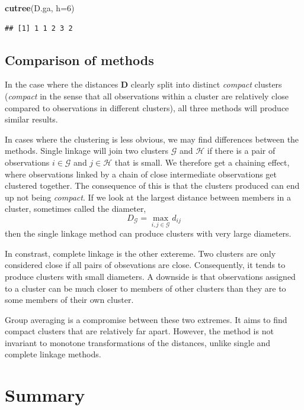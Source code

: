 \documentclass[
]{book}
\newenvironment{Shaded}{\begin{snugshade}}{\end{snugshade}}
\newcommand{\AttributeTok}[1]{\textcolor[rgb]{0.13,0.29,0.53}{#1}}
\newcommand{\DecValTok}[1]{\textcolor[rgb]{0.00,0.00,0.81}{#1}}
\newcommand{\FunctionTok}[1]{\textcolor[rgb]{0.13,0.29,0.53}{\textbf{#1}}}
\newcommand{\NormalTok}[1]{#1}
\theoremstyle{definition}
\theoremstyle{definition}
\theoremstyle{definition}
\theoremstyle{definition}
\theoremstyle{remark}
\begin{document}
\begin{Shaded}
\begin{Highlighting}[]
\FunctionTok{cutree}\NormalTok{(D.ga, }\AttributeTok{h=}\DecValTok{6}\NormalTok{)}
\end{Highlighting}
\end{Shaded}

\begin{verbatim}
## [1] 1 1 2 3 2
\end{verbatim}

\hypertarget{comparison-of-methods}{%
\subsection{Comparison of methods}\label{comparison-of-methods}}

In the case where the distances \(\mathbf D\) clearly split into distinct \emph{compact} clusters (\emph{compact} in the sense that all observations within a cluster are relatively close compared to observations in different clusters), all three methods will produce similar results.

In cases where the clustering is less obvious, we may find differences between the methods. Single linkage will join two clusters \(\mathcal{G}\) and \(\mathcal{H}\) if there is a pair of observations \(i\in \mathcal{G}\) and \(j \in \mathcal{H}\) that is small. We therefore get a chaining effect, where observations linked by a chain of close intermediate observations get clustered together. The consequence of this is that the clusters produced can end up not being \emph{compact}. If we look at the largest distance between members in a cluster, sometimes called the diameter,
\[D_\mathcal{G}= \max_{i,j \in \mathcal{G}} d_{ij}\]
then the single linkage method can produce clusters with very large diameters.

In constrast, complete linkage is the other extereme. Two clusters are only considered close if all pairs of obsevations are close. Consequently, it tends to produce clusters with small diameters. A downside is that observations assigned to a cluster can be much closer to members of other clusters than they are to some members of their own cluster.

Group averaging is a compromise between these two extremes. It aims to find compact clusters that are relatively far apart. However, the method is not invariant to monotone transformations of the distances, unlike single and complete linkage methods.

\hypertarget{summary}{%
\section{Summary}\label{summary}}
\end{document}
